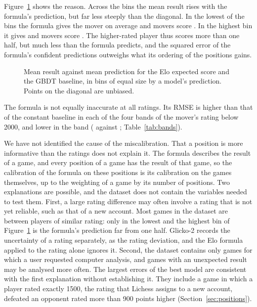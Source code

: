 \documentclass[11pt]{article}
\begin{document}
\iflook
Figure~\ref{fig:formula} shows the reason. Across the bins the mean result
rises with the formula's prediction, but far less steeply than the diagonal. In the lowest
of the  bins the formula gives the mover
 on average and movers score
. In the highest bin it gives
 and movers score
. The higher-rated player thus
scores more than one half, but much less than the formula predicts, and the
squared error of the formula's confident predictions outweighs what its
ordering of the positions gains.

\begin{figure}[htbp]\centering
{}
\caption{Mean result against mean prediction for the Elo expected score and
the GBDT baseline, in bins of equal size by a model's prediction. Points on
the diagonal are unbiased.}
\label{fig:formula}
\end{figure}
\fi

The formula is not equally inaccurate at all ratings. Its RMSE is higher than
that of the constant baseline in each of the four bands of the mover's rating
below 2000, and lower in the band  (
against ; Table~\ref{tab:bands}).

We have not identified the cause of the miscalibration. That a position is
more informative than the ratings does not explain it. The formula describes the result of a game,
and every position of a game has the result of that game, so the calibration
of the formula on these positions is its calibration on the games themselves,
up to the weighting of a game by its number of positions. Two explanations
are possible, and the dataset does not contain the variables needed to test
them. First, a large rating difference may often involve a rating that is not
yet reliable, such as that of a new account.\iflook{} Most games in the
dataset are between players of similar rating: only in the lowest and the
highest bin of Figure~\ref{fig:formula} is the formula's prediction far from
one half.\fi{} Glicko-2 records the uncertainty of a rating separately, as
the rating deviation, and the Elo formula applied to the rating alone ignores
it. Second, the dataset contains only games for which a user requested
computer analysis, and games with an unexpected result may be analysed more
often.\iflook{} The largest errors of the best model are consistent with the
first explanation without establishing it. They include a game in which a
player rated exactly 1500, the rating that Lichess assigns to a new account,
defeated an opponent rated more than 900 points higher
(Section~\ref{sec:positions}).\fi
\end{document}

